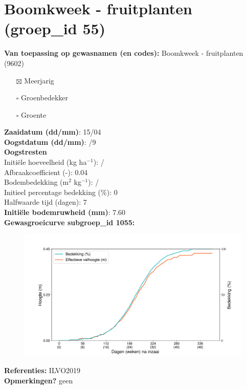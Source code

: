 \documentclass{article}
\begin{document}
 \section{Boomkweek - fruitplanten (groep\_id 55)} 
 \textbf{Van toepassing op gewasnamen (en codes):} Boomkweek - fruitplanten (9602) 
 \begin{multicols}{3} \begin{itemize} \item[$\boxtimes$] Meerjarig \item[$\square$] Groenbedekker \item[$\square$] Groente \end{itemize} \end{multicols} 
  \textbf{Zaaidatum (dd/mm)}: 15/04  \vspace{0.10cm} \\ 
  \textbf{Oogstdatum (dd/mm)}: /9  \vspace{0.10cm} \\ 
  \textbf{Oogstresten} \vspace{0.05cm} \\ 
  \tab Initi\"{e}le hoeveelheid (kg ha$^{-1}$): / \vspace{0.05cm} \\ 
  \tab Afbraakcoefficient (-): 0.04 \vspace{0.05cm} \\ 
  \tab Bodembedekking (m$^2$ kg$^{-1}$): / \vspace{0.05cm} \\ 
  \tab Initieel percentage bedekking (\%): 0 \vspace{0.05cm} \\ 
  \tab Halfwaarde tijd (dagen): 7 \vspace{0.05cm} \\ 
  \textbf{Initi\"{e}le bodemruwheid (mm)}: 7.60 \vspace{0.05cm} \\ 
  \textbf{Gewasgroeicurve subgroep\_id 1055:} 
 \begin{center} \begin{figure}[H] \includegraphics[width=12.5cm]{temp/1055.png} \end{figure} \end{center} 
  \textbf{Referenties:} ILVO2019 \vspace{0.10cm} \\ 
  \textbf{Opmerkingen?} geen \vspace{0.10cm} \\ 
 \newpage 
\end{document}
